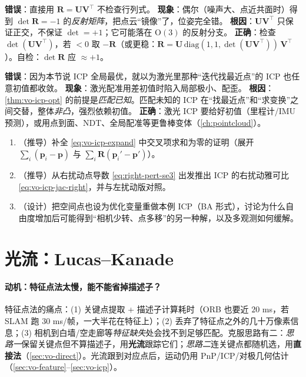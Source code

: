 \begin{pitfall}
\textbf{错误}：直接用 $\mathbf{R}=\mathbf{U}\mathbf{V}^\top$ 不检查行列式。
\textbf{现象}：偶尔（噪声大、点近共面时）得到 $\det\mathbf{R}=-1$ 的\emph{反射矩阵}，把点云“镜像”了，位姿完全错。
\textbf{根因}：$\mathbf{U}\mathbf{V}^\top$ 只保证正交，不保证 $\det=+1$；它可能落在 $\mathrm{O}(3)$ 的反射分支。
\textbf{正确}：检查 $\det(\mathbf{U}\mathbf{V}^\top)$，若 $<0$ 取 $-\mathbf{R}$（或更稳：$\mathbf{R}=\mathbf{U}\,\mathrm{diag}(1,1,\det(\mathbf{U}\mathbf{V}^\top))\,\mathbf{V}^\top$）。自检：$\det\mathbf{R}$ 应 $\approx+1$。
\end{pitfall}

\begin{pitfall}
\textbf{错误}：因为本节说 ICP 全局最优，就以为激光里那种“迭代找最近点”的 ICP 也任意初值都收敛。
\textbf{现象}：激光配准用差初值时陷入局部极小、配歪。
\textbf{根因}：\cref{thm:vo-icp-opt} 的前提是\emph{匹配已知}。匹配未知的 ICP 在“找最近点”和“求变换”之间交替，整体\emph{非凸}，强烈依赖初值。
\textbf{正确}：激光 ICP 要给好初值（里程计/IMU 预测），或用点到面、NDT、全局配准等更鲁棒变体（\cref{ch:pointcloud}）。
\end{pitfall}

\begin{practice}
\begin{enumerate}
  \item （推导）补全 \cref{eq:vo-icp-expand} 中交叉项求和为零的证明（展开 $\sum_i(\mathbf{p}_i-\mathbf{p})$ 与 $\sum_i\mathbf{R}(\mathbf{p}_i'-\mathbf{p}')$）。
  \item （推导）从右扰动点导数 \cref{eq:right-pert-se3} 出发推出 ICP 的右扰动雅可比 \cref{eq:vo-icp-jac-right}，并与左扰动版对照。
  \item （设计）把空间点也设为优化变量重做本例 ICP（BA 形式），讨论为什么自由度增加后可能得到“相机少转、点多移”的另一种解，以及多观测如何缓解。
\end{enumerate}
\end{practice}

\section{光流：Lucas--Kanade}
\label{sec:vo-flow}

\paragraph{动机：特征点法太慢，能不能省掉描述子？}特征点法的痛点\cite{gaoxiang2019slam14}：(1) 关键点提取 + 描述子计算耗时（ORB 也要近 $20$ ms，若 SLAM 跑 $30$ ms/帧，一大半花在特征上）；(2) 丢弃了特征点之外的几十万像素信息；(3) 相机到白墙/空走廊等\emph{特征缺失}处会找不到足够匹配。克服思路有二：\emph{思路一}保留关键点但不算描述子，用\textbf{光流}跟踪它们；\emph{思路二}连关键点都随机选，用\textbf{直接法}（\cref{sec:vo-direct}）。光流跟到对应点后，运动仍用 PnP/ICP/对极几何估计（\cref{sec:vo-feature}--\ref{sec:vo-icp}）。

